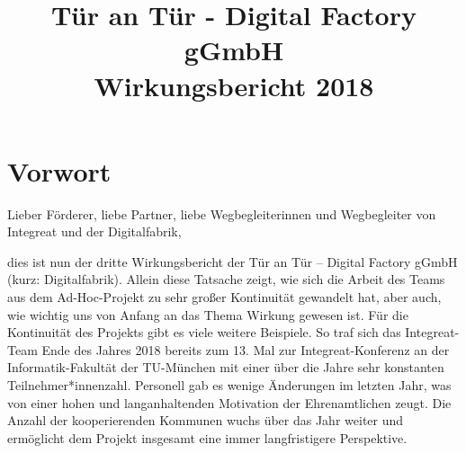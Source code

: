 \documentclass[12pt, a4paper]{article} %
\begin{document}
\title{
Tür an Tür - Digital Factory gGmbH\\
Wirkungsbericht 2018\\
} %

\AddToShipoutPicture*{\BackgroundPic}

\date{}

\maketitle
\thispagestyle{empty} %



\newpage
\tableofcontents

\newpage

\hypertarget{vorwort}{%
\section{Vorwort}\label{vorwort}}

Lieber Förderer, liebe Partner, liebe Wegbegleiterinnen und Wegbegleiter
von Integreat und der Digitalfabrik,

dies ist nun der dritte Wirkungsbericht der Tür an Tür – Digital Factory
gGmbH (kurz: Digitalfabrik). Allein diese Tatsache zeigt, wie sich die
Arbeit des Teams aus dem Ad-Hoc-Projekt zu sehr großer Kontinuität
gewandelt hat, aber auch, wie wichtig uns von Anfang an das Thema
Wirkung gewesen ist. Für die Kontinuität des Projekts gibt es viele
weitere Beispiele. So traf sich das Integreat-Team Ende des Jahres 2018
bereits zum 13. Mal zur Integreat-Konferenz an der Informatik-Fakultät
der TU-München mit einer über die Jahre sehr konstanten
Teilnehmer*innenzahl. Personell gab es wenige Änderungen im letzten
Jahr, was von einer hohen und langanhaltenden Motivation der
Ehrenamtlichen zeugt. Die Anzahl der kooperierenden Kommunen wuchs über
das Jahr weiter und ermöglicht dem Projekt insgesamt eine immer
langfristigere Perspektive.
\end{document}
